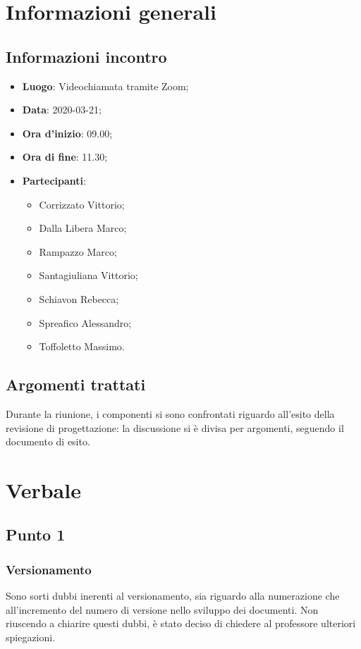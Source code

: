 \section{Informazioni generali}
    \subsection{Informazioni incontro}
        \begin{itemize}
            \item \textbf{Luogo}: Videochiamata tramite Zoom;
            \item \textbf{Data}: 2020-03-21;
            \item \textbf{Ora d'inizio}: 09.00;
            \item \textbf{Ora di fine}: 11.30;
            \item \textbf{Partecipanti}: \begin{itemize}
                \item Corrizzato Vittorio;
                \item Dalla Libera Marco;
                \item Rampazzo Marco;
                \item Santagiuliana Vittorio;
                \item Schiavon Rebecca;
                \item Spreafico Alessandro;
                \item Toffoletto Massimo.
            \end{itemize}
        \end{itemize}
    \subsection{Argomenti trattati}
        Durante la riunione, i componenti si sono confrontati riguardo all'esito della revisione di progettazione: la discussione si è divisa per argomenti, seguendo il documento di esito.
\section{Verbale}
    \subsection{Punto 1}
        \subsubsection{Versionamento}
            Sono sorti dubbi inerenti al versionamento, sia riguardo alla numerazione che all'incremento del numero di versione nello sviluppo dei documenti. Non riuscendo a chiarire questi dubbi, è stato deciso di chiedere al professore ulteriori spiegazioni.
